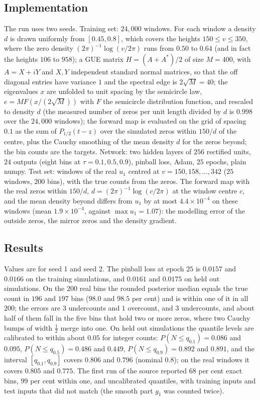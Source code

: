 \subsection{Implementation}

The run uses two seeds. Training set: $24{,}000$ windows. For each window a density $d$ is drawn uniformly from $[0.45,0.8]$, which covers the heights $150\le v\le350$, where the zero density $(2\pi)^{-1}\log(v/2\pi)$ runs from $0.50$ to $0.64$ (and in fact the heights $106$ to $958$); a GUE matrix $H=(A+A^*)/2$ of size $M=400$, with $A=X+iY$ and $X,Y$ independent standard normal matrices, so that the off diagonal entries have variance $1$ and the spectral edge is $2\sqrt M=40$; the eigenvalues $x$ are unfolded to unit spacing by the semicircle law, $e=MF(x/(2\sqrt M))$ with $F$ the semicircle distribution function, and rescaled to density $d$ (the measured number of zeros per unit length divided by $d$ is $0.998$ over the $24{,}000$ windows); the forward map is evaluated on the grid of spacing $0.1$ as the sum of $P_{1/2}(t-z)$ over the simulated zeros within $150/d$ of the centre, plus the Cauchy smoothing of the mean density $d$ for the zeros beyond; the bin counts are the targets. Network: two hidden layers of $256$ rectified units, $24$ outputs (eight bins at $\tau=0.1,0.5,0.9$), pinball loss, Adam, $25$ epochs, plain numpy. Test set: windows of the real $u_1$ centred at $v=150,158,\dots,342$ ($25$ windows, $200$ bins), with the true counts from the zeros. The forward map with the real zeros within $150/d$, $d=(2\pi)^{-1}\log(c/2\pi)$ at the window centre $c$, and the mean density beyond differs from $u_1$ by at most $4.4\times10^{-4}$ on these windows (mean $1.9\times10^{-4}$, against $\max u_1=1.07$): the modelling error of the outside zeros, the mirror zeros and the density gradient.

\subsection{Results}

\begin{resultpar}\label{lo:res:gbc}Values are for seed 1 and seed 2. The pinball loss at epoch $25$ is $0.0157$ and $0.0166$ on the training simulations, and $0.0161$ and $0.0175$ on held out simulations. On the $200$ real bins the rounded posterior median equals the true count in $196$ and $197$ bins ($98.0$ and $98.5$ per cent) and is within one of it in all $200$; the errors are $3$ undercounts and $1$ overcount, and $3$ undercounts, and about half of them fall in the five bins that hold two or more zeros, where two Cauchy bumps of width $\tfrac12$ merge into one. On held out simulations the quantile levels are calibrated to within about $0.05$ for integer counts: $P(N\le q_{0.1})=0.086$ and $0.095$, $P(N\le q_{0.5})=0.486$ and $0.449$, $P(N\le q_{0.9})=0.892$ and $0.891$, and the interval $[q_{0.1},q_{0.9}]$ covers $0.806$ and $0.796$ (nominal $0.8$); on the real windows it covers $0.805$ and $0.775$. The first run of the source reported $68$ per cent exact bins, $99$ per cent within one, and uncalibrated quantiles, with training inputs and test inputs that did not match (the smooth part $g_1$ was counted twice).\end{resultpar}

